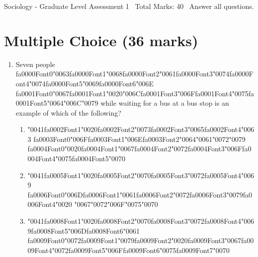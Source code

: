 \documentclass[12pt]{article}
\begin{document}
\begin{center}
Sociology - Graduate Level Assessment 1 \
Total Marks: 40 \
Answer all questions.
\end{center}

\section*{Multiple Choice (36 marks)}
\begin{enumerate}[label=\arabic*.]
\item Seven people {\csname fa0000Font0\endcsname\char"0063}{\csname fa0000Font1\endcsname\char"0068}{\csname fa0000Font2\endcsname\char"0061}{\csname fa0000Font3\endcsname\char"0074}{\csname fa0000Font4\endcsname\char"0074}{\csname fa0000Font5\endcsname\char"0069}{\csname fa0000Font6\endcsname\char"006E} {\csname fa0001Font0\endcsname\char"0067}{\csname fa0001Font1\endcsname\char"0020}{\char"006C}{\csname fa0001Font3\endcsname\char"006F}{\csname fa0001Font4\endcsname\char"0075}{\csname fa0001Font5\endcsname\char"0064}{\char"006C}{\char"0079} while waiting for a bus at a bus stop is an example of which of the following?
\begin{enumerate}[label=(\alph*)]
    \item {\char"0041}{\csname fa0002Font1\endcsname\char"0020}{\csname fa0002Font2\endcsname\char"0073}{\csname fa0002Font3\endcsname\char"0065}{\csname fa0002Font4\endcsname\char"0063} {\csname fa0003Font0\endcsname\char"006F}{\csname fa0003Font1\endcsname\char"006E}{\csname fa0003Font2\endcsname\char"0064}{\char"0061}{\char"0072}{\char"0079} {\csname fa0004Font0\endcsname\char"0020}{\csname fa0004Font1\endcsname\char"0067}{\csname fa0004Font2\endcsname\char"0072}{\csname fa0004Font3\endcsname\char"006F}{\csname fa0004Font4\endcsname\char"0075}{\csname fa0004Font5\endcsname\char"0070}
    \item {\char"0041}{\csname fa0005Font1\endcsname\char"0020}{\csname fa0005Font2\endcsname\char"0070}{\csname fa0005Font3\endcsname\char"0072}{\csname fa0005Font4\endcsname\char"0069} {\csname fa0006Font0\endcsname\char"006D}{\csname fa0006Font1\endcsname\char"0061}{\csname fa0006Font2\endcsname\char"0072}{\csname fa0006Font3\endcsname\char"0079}{\csname fa0006Font4\endcsname\char"0020} {\char"0067}{\char"0072}{\char"006F}{\char"0075}{\char"0070}
    \item {\char"0041}{\csname fa0008Font1\endcsname\char"0020}{\csname fa0008Font2\endcsname\char"0070}{\csname fa0008Font3\endcsname\char"0072}{\csname fa0008Font4\endcsname\char"0069}{\csname fa0008Font5\endcsname\char"006D}{\csname fa0008Font6\endcsname\char"0061} {\csname fa0009Font0\endcsname\char"0072}{\csname fa0009Font1\endcsname\char"0079}{\csname fa0009Font2\endcsname\char"0020}{\csname fa0009Font3\endcsname\char"0067}{\csname fa0009Font4\endcsname\char"0072}{\csname fa0009Font5\endcsname\char"006F}{\csname fa0009Font6\endcsname\char"0075}{\csname fa0009Font7\endcsname\char"0070}

\end{enumerate}
\end{enumerate}
\end{document}
